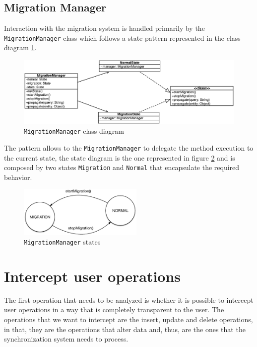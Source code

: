 \subsection{Migration Manager}
Interaction with the migration system is handled primarily by the \texttt{MigrationManager} class which follows a state pattern represented in the class diagram \ref{fig:migration-class-diagram}. 
 
\begin{figure}[tbh]
  \centering
  \includegraphics[width=14cm]{images/migration_class_diagram}
  \caption{\texttt{MigrationManager} class diagram}
  \label{fig:migration-class-diagram}
\end{figure} 

\noindent The pattern allows to the \texttt{MigrationManager} to delegate the method execution to the current state, the state diagram is the one represented in figure \ref{fig:migration-fsa} and is composed by two states \texttt{Migration} and \texttt{Normal} that encapsulate the required behavior.
    
\begin{figure}[tbh]
  \centering
  \includegraphics[width=6cm]{images/migration_fsa}
  \caption{\texttt{MigrationManager} states}
  \label{fig:migration-fsa}
\end{figure} 

\section{Intercept user operations}
\label{sec:intercept-user-operations}
The first operation that needs to be analyzed is whether it is possible to intercept user operations in a way that is completely transparent to the user.
The operations that we want to intercept are the insert, update and delete operations, in that, they are the operations that alter data and, thus, are the ones that the synchronization system needs to process.

